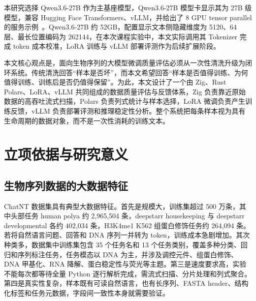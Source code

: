 \documentclass{article}
\begin{document}
本研究选择 Qwen3.6-27B 作为主基座模型，Qwen3.6-27B 模型卡显示其为 27B 级模型，兼容 Hugging Face Transformers、vLLM，并给出了 8 GPU tensor parallel 的服务示例~\cite{qwen36}。Qwen3.6-27B 约 52GB，配置显示文本侧隐藏维度为 5120、64 层、最长位置编码为 262144，在本次课程实验中，本文实际调用其 Tokenizer 完成 token 成本校准，LoRA 训练与 vLLM 部署评测作为后续扩展阶段。

本文核心观点是，面向生物序列的大模型微调质量评估必须从一次性清洗升级为闭环系统。传统清洗回答“样本是否坏”，而本文希望回答“样本是否值得训练、为何值得训练、训练后是否仍值得保留”。为此，本文设计了一个由 Zig、Rust Polars、LoRA、vLLM 共同组成的数据质量评估与反馈体系，Zig 负责靠近原始数据的高吞吐流式扫描，Polars 负责列式统计与样本选择，LoRA 微调负责产生训练反馈，vLLM 负责部署评测和推理稳定性分析。整个系统把每条样本视为具有生命周期的数据对象，而不是一次性消耗的训练文本。



\section{立项依据与研究意义}
\subsection{生物序列数据的大数据特征}
ChatNT 数据集具有典型大数据特征。首先是规模大，训练集超过 500 万条，其中头部任务 human polya 约 2,965,504 条，deepstarr housekeeping 与 deepstarr developmental 各约 402,034 条，H3K4me1 K562 组蛋白修饰任务约 264,094 条。若将自然语言问题、回答和 DNA 序列一并转为 token，训练成本急剧增加。其次种类多，数据集中训练集包含 35 个任务名和 13 个任务类别，覆盖多种分类、回归和序列标注任务，任务模态以 DNA 为主，并涉及调控元件、组蛋白修饰、DNA 甲基化、RNA 降解、蛋白稳定性与荧光等主题。第三是速度要求高，实验不能每次都等待全量 Python 逐行解析完成，需流式扫描、分片处理和列式聚合。第四是真实性复杂，样本既有可读自然语言，也有长序列、FASTA header、结构化标签和任务元数据，字段间一致性本身就需要验证。
\end{document}
